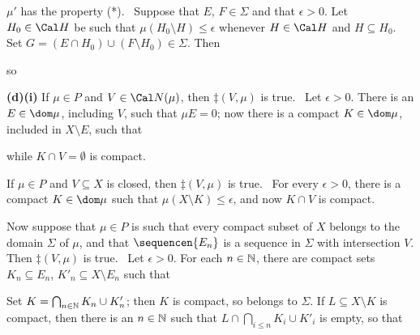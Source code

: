 {\medskip

 $\mu'$ has the property (*).   \Prf\
Suppose that
$E$, $F\in\Sigma$ and that $\epsilon>0$.   Let $H_0\in\Cal H$ be such that
$\mu(H_0\setminus H)\le\epsilon$ whenever $H\in\Cal H$ and
$H\subseteq H_0$.   Set $G=(E\cap H_0)\cup(F\setminus H_0)\in\Sigma$.
Then


\noindent so


\medskip

{\bf (d)(i)} If $\mu\in P$ and $V\in\Cal N(\mu)$, then $\ddagger(V,\mu)$
is true.   \Prf\ Let $\epsilon>0$.
There is an $E\in\dom\mu$, including $V$, such that
$\mu E=0$;   now there is a compact $K\in\dom\mu$, included in
$X\setminus E$, such that


\noindent while $K\cap V=\emptyset$ is compact.\ \Qed

\medskip

 If $\mu\in P$ and $V\subseteq X$ is closed, then
$\ddagger(V,\mu)$ is true.   \Prf\ For every $\epsilon>0$, there is a
compact $K\in\dom\mu$ such that $\mu(X\setminus K)\le\epsilon$,
and now $K\cap V$ is compact.\ \Qed

\medskip

 Now suppose that $\mu\in P$ is such that every compact
subset of $X$ belongs to the domain $\Sigma$ of $\mu$, and that
$\sequencen{E_n}$ is a sequence in $\Sigma$ with intersection $V$.   Then
$\ddagger(V,\mu)$ is true.   \Prf\ Let $\epsilon>0$.   For each
$n\in\Bbb N$, there are compact sets
$K_n\subseteq E_n$, $K'_n\subseteq X\setminus E_n$ such that

\Centerline{$\mu(E_n\setminus K_n)+\mu((X\setminus E_n)\setminus K'_n)
\le 2^{-n-1}\epsilon$.}

\noindent Set $K=\bigcap_{n\in\Bbb N}K_n\cup K'_n$;  then $K$ is compact,
so belongs to $\Sigma$.   If $L\subseteq X\setminus K$ is compact, then
there is an $n\in\Bbb N$ such that $L\cap\bigcap_{i\le n}K_i\cup K'_i$
is empty, so that


}
